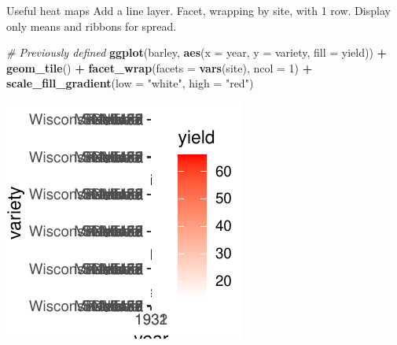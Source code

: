 \documentclass[
  ignorenonframetext,
]{beamer}
\newenvironment{Shaded}{\begin{snugshade}}{\end{snugshade}}
\newcommand{\AttributeTok}[1]{\textcolor[rgb]{0.13,0.29,0.53}{#1}}
\newcommand{\CommentTok}[1]{\textcolor[rgb]{0.56,0.35,0.01}{\textit{#1}}}
\newcommand{\DecValTok}[1]{\textcolor[rgb]{0.00,0.00,0.81}{#1}}
\newcommand{\FunctionTok}[1]{\textcolor[rgb]{0.13,0.29,0.53}{\textbf{#1}}}
\newcommand{\NormalTok}[1]{#1}
\newcommand{\SpecialCharTok}[1]{\textcolor[rgb]{0.81,0.36,0.00}{\textbf{#1}}}
\newcommand{\StringTok}[1]{\textcolor[rgb]{0.31,0.60,0.02}{#1}}
\begin{document}
\begin{frame}[fragile]{Useful heat maps}
\label{useful-heat-maps-5}
Add a line layer. Facet, wrapping by site, with 1 row. Display only
means and ribbons for spread.


\begin{Shaded}
\begin{Highlighting}[]
\CommentTok{\# Previously defined}
\FunctionTok{ggplot}\NormalTok{(barley, }\FunctionTok{aes}\NormalTok{(}\AttributeTok{x =}\NormalTok{ year, }\AttributeTok{y =}\NormalTok{ variety, }\AttributeTok{fill =}\NormalTok{ yield)) }\SpecialCharTok{+} \FunctionTok{geom\_tile}\NormalTok{() }\SpecialCharTok{+}
    \FunctionTok{facet\_wrap}\NormalTok{(}\AttributeTok{facets =} \FunctionTok{vars}\NormalTok{(site), }\AttributeTok{ncol =} \DecValTok{1}\NormalTok{) }\SpecialCharTok{+} \FunctionTok{scale\_fill\_gradient}\NormalTok{(}\AttributeTok{low =} \StringTok{"white"}\NormalTok{,}
    \AttributeTok{high =} \StringTok{"red"}\NormalTok{)}
\end{Highlighting}
\end{Shaded}

\begin{center}\includegraphics[width=0.5\linewidth]{Figs/unnamed-chunk-117-1} \end{center}
\end{frame}
\end{document}
